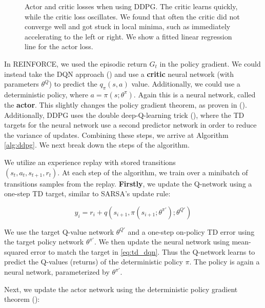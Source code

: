 \documentclass{article}
\begin{document}
\begin{figure}[t!]
\begin{center}
        \caption{Actor and critic losses when using DDPG. The critic learns quickly, while the critic loss oscillates. We found that often the critic did not converge well and got stuck in local minima, such as immediately accelerating to the left or right. We show a fitted linear regression line for the actor loss.}
        \label{fig:ddpg_losses}
        \end{center}
        \vskip -5mm
    \end{figure}


    In REINFORCE, we used the episodic return $G_t$ in the policy gradient. We could instead take the DQN approach (\cite{mnih_playing_2013}) and use a \textbf{critic} neural network (with parameters $\theta^Q$) to predict the $q_\pi(s, a)$ value. Additionally, we could use a deterministic policy, where $a = \pi(s; \theta^\pi)$. Again this is a neural network, called the \textbf{actor}. This slightly changes the policy gradient theorem, as proven in (\cite{pmlr-v32-silver14}). Additionally, DDPG uses the double deep-Q-learning trick (\cite{van_hasselt_deep_2015}), where the TD targets for the neural network use a second predictor network in order to reduce the variance of updates. Combining these steps, we arrive at Algorithm \ref{alg:ddpg}. We next break down the steps of the algorithm.

    We utilize an experience replay with stored transitions \\
    $(s_t, a_t, s_{t + 1}, r_t)$. At each step of the algorithm, we train over a minibatch of transitions samples from the replay. \textbf{Firstly}, we update the Q-network using a one-step TD target, similar to SARSA's update rule:

    \begin{equation} \label{eq:td_dqn}
        y_i = r_i + q(s_{i + 1}, \pi(s_{i + 1}; \theta^{\pi'}); \theta^{Q'})
    \end{equation}

    We use the target Q-value network $\theta^{Q'}$ and a one-step on-policy TD error using the target policy network $\theta^{\pi'}$. We then update the neural network using mean-squared error to match the target in \autoref{eq:td_dqn}. Thus the Q-network learns to predict the Q-values (returns) of the deterministic policy $\pi$. The policy is again a neural network, parameterized by $\theta^{\pi'}$.

    Next, we update the actor network using the deterministic policy gradient theorem (\cite{pmlr-v32-silver14}):
\end{document}
